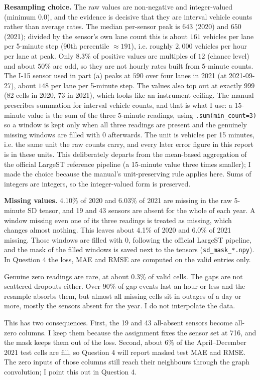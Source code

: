 \documentclass[11pt,letterpaper]{article}
\begin{document}
\textbf{Resampling choice.} The raw values are non-negative and integer-valued (minimum
$0.0$), and the evidence is decisive that they are interval vehicle counts rather than
average rates. The median per-sensor peak is $643$ (2020) and $650$ (2021); divided by the
sensor's own lane count this is about $161$ vehicles per lane per 5-minute step (90th
percentile $\approx 191$), i.e. roughly $2{,}000$ vehicles per hour per lane at peak. Only $8.3\%$ of positive values are multiples of $12$ (chance level)
and about $50\%$ are odd, so they are not hourly rates built from 5-minute counts. The
I-15 sensor used in part (a) peaks at $590$ over four lanes in 2021 (at 2021-09-27), about
$148$ per lane per 5-minute step. The values also top out at exactly $999$ (82 cells in 2020,
73 in 2021),
which looks like an instrument ceiling. The manual prescribes summation for interval vehicle
counts, and that is what I use: a 15-minute value is the sum of the three 5-minute readings,
using \texttt{.sum(min\_count=3)} so a window is kept only when all three readings are
present and the genuinely missing windows are
filled with $0$ afterwards. The unit is vehicles per 15 minutes, i.e. the same unit the raw
counts carry, and every later error figure in this report is in these units. This deliberately
departs from the mean-based aggregation of the official LargeST reference pipeline (a
15-minute value three times smaller); I made the choice because the manual's unit-preserving
rule applies here. Sums of integers are integers, so the integer-valued form is preserved.

\textbf{Missing values.} 4.10\% of 2020 and 6.03\% of 2021 are missing in the raw 5-minute
SD tensor, and 19 and 43 sensors are absent for the whole of each year. A window missing
even one of its three readings is treated as missing, which changes almost nothing. This
leaves about 4.1\% of 2020 and 6.0\% of 2021 missing. Those windows are filled with $0$,
following the official LargeST pipeline, and the mask of the filled windows is saved next to
the tensors (\texttt{sd\_mask\_*.npy}). In Question 4 the loss, MAE and RMSE are computed on
the valid entries only.

Genuine zero readings are rare, at about 0.3\% of valid cells. The gaps are not scattered
dropouts either. Over 90\% of gap events last an hour or less and the resample absorbs them,
but almost all missing cells sit in outages of a day or more, mostly the sensors absent for
the year. I do not interpolate the data.

This has two consequences. First, the 19 and 43 all-absent sensors become all-zero columns. I keep them
because the assignment fixes the sensor set at 716, and the mask keeps them out of the loss.
Second, about 6\% of the April--December 2021 test cells are fill, so Question 4 will report
masked test MAE and RMSE. The zero inputs of those columns still reach their neighbours
through the graph convolution; I point this out in Question 4.
\end{document}
